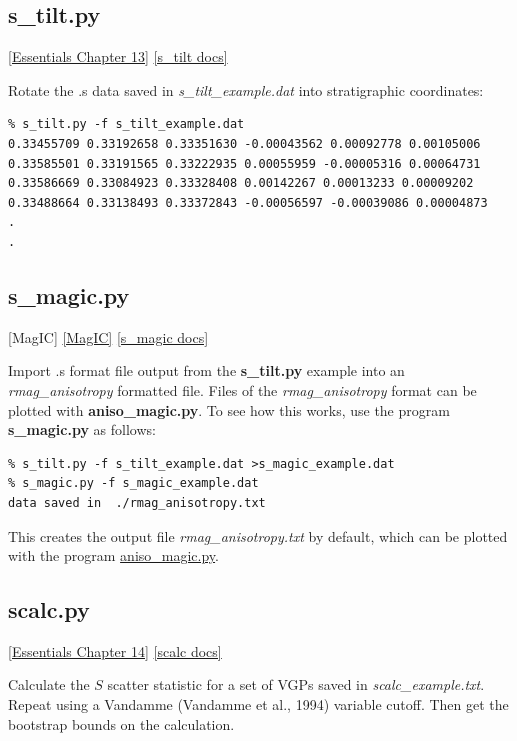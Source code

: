 \documentclass[11pt]{book}
\begin{document}
{{
\subsection{s\_tilt.py}
\href{http://magician.ucsd.edu/Essentials_2/WebBook2ch13.html#ch13}{[Essentials Chapter 13]}
\href{http://earthref.org/PmagPy/pmagpydocs/s_tilt-module.html}{[s\_tilt docs]}

Rotate the .s data saved in {\it s\_tilt\_example.dat} into stratigraphic coordinates:

\begin{verbatim}
% s_tilt.py -f s_tilt_example.dat 
0.33455709 0.33192658 0.33351630 -0.00043562 0.00092778 0.00105006 
0.33585501 0.33191565 0.33222935 0.00055959 -0.00005316 0.00064731 
0.33586669 0.33084923 0.33328408 0.00142267 0.00013233 0.00009202 
0.33488664 0.33138493 0.33372843 -0.00056597 -0.00039086 0.00004873 
.
.
\end{verbatim}

\subsection{s\_magic.py} [MagIC]
\href{#MagIC}{[MagIC]}
\href{http://earthref.org/PmagPy/pmagpydocs/s_magic-module.html}{[s\_magic docs]}

Import .s format file output from the {\bf s\_tilt.py} example into an {\it rmag\_anisotropy} formatted file.  Files of the {\it rmag\_anisotropy} format can be plotted  with {\bf aniso\_magic.py}.   To see how this works,  use the program {\bf s\_magic.py} as follows:

\begin{verbatim}
% s_tilt.py -f s_tilt_example.dat >s_magic_example.dat
% s_magic.py -f s_magic_example.dat 
data saved in  ./rmag_anisotropy.txt
\end{verbatim}

This creates the output file {\it rmag\_anisotropy.txt}  by default, which can be plotted with the program \href{#aniso_magic.py}{aniso\_magic.py}.  


\subsection{scalc.py} 
\href{http://magician.ucsd.edu/Essentials_2/WebBook2ch14.html#ch14}{[Essentials Chapter 14]}
\href{http://earthref.org/PmagPy/pmagpydocs/scalc-module.html}{[scalc docs]}


Calculate the $S$ scatter statistic for a set of VGPs saved in {\it scalc\_example.txt}.  Repeat using a Vandamme (Vandamme et al., 1994) \nocite{vandamme94} variable cutoff.  Then get the bootstrap bounds on the calculation.  

}}
\end{document}

